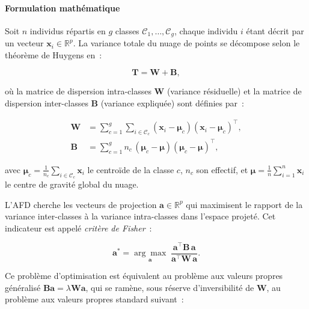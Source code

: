 \documentclass[12pt, a4paper, oneside]{report}
\begin{document}
	\paragraph{Formulation mathématique}
	
	Soit $n$ individus répartis en $g$ classes $\mathcal{C}_1, \ldots, \mathcal{C}_g$, chaque individu $i$ étant décrit par un vecteur $\mathbf{x}_i \in \mathbb{R}^p$. La variance totale du nuage de points se décompose selon le théorème de Huygens en~:
	
	\begin{equation}
		\mathbf{T} = \mathbf{W} + \mathbf{B},
		\label{eq:decomp_variance}
	\end{equation}
	
	où la matrice de dispersion intra-classes $\mathbf{W}$ (variance résiduelle) et la matrice de dispersion inter-classes $\mathbf{B}$ (variance expliquée) sont définies par~:
	
	\begin{align}
		\mathbf{W} &= \sum_{c=1}^{g} \sum_{i \in \mathcal{C}_c} \left(\mathbf{x}_i - \boldsymbol{\mu}_c\right) \left(\mathbf{x}_i - \boldsymbol{\mu}_c\right)^{\top}, \label{eq:W} \\[6pt]
		\mathbf{B} &= \sum_{c=1}^{g} n_c\,\left(\boldsymbol{\mu}_c - \boldsymbol{\mu}\right) \left(\boldsymbol{\mu}_c - \boldsymbol{\mu}\right)^{\top}, \label{eq:B}
	\end{align}
	
	avec $\boldsymbol{\mu}_c = \frac{1}{n_c}\sum_{i \in \mathcal{C}_c} \mathbf{x}_i$ le centroïde de la classe $c$, $n_c$ son effectif, et $\boldsymbol{\mu} = \frac{1}{n}\sum_{i=1}^{n} \mathbf{x}_i$ le centre de gravité global du nuage.
	
	L'AFD cherche les vecteurs de projection $\mathbf{a} \in \mathbb{R}^p$ qui maximisent le rapport de la variance inter-classes à la variance intra-classes dans l'espace projeté. Cet indicateur est appelé \textit{critère de Fisher}~:
	
	\begin{equation}
		\mathbf{a}^* = \underset{\mathbf{a}}{\arg\max}\; \frac{\mathbf{a}^{\top}\mathbf{B}\,\mathbf{a}}{\mathbf{a}^{\top}\mathbf{W}\,\mathbf{a}}.
		\label{eq:fisher}
	\end{equation}
	
	Ce problème d'optimisation est équivalent au problème aux valeurs propres généralisé $\mathbf{B}\mathbf{a} = \lambda\mathbf{W}\mathbf{a}$, qui se ramène, sous réserve d'inversibilité de $\mathbf{W}$, au problème aux valeurs propres standard suivant~:
	
\end{document}
